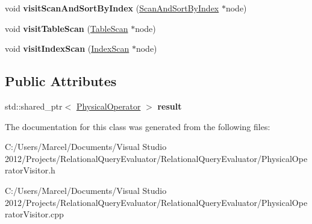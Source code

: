 \begin{DoxyCompactItemize}
\item 
\hypertarget{class_cloning_physical_operator_visitor_a5bead629c3b23b39316b8b86913617e7}{void {\bfseries visit\+Scan\+And\+Sort\+By\+Index} (\hyperlink{class_scan_and_sort_by_index}{Scan\+And\+Sort\+By\+Index} $\ast$node)}\label{class_cloning_physical_operator_visitor_a5bead629c3b23b39316b8b86913617e7}

\item 
\hypertarget{class_cloning_physical_operator_visitor_aa7066c58c8963023737f1b8e0eca7bca}{void {\bfseries visit\+Table\+Scan} (\hyperlink{class_table_scan}{Table\+Scan} $\ast$node)}\label{class_cloning_physical_operator_visitor_aa7066c58c8963023737f1b8e0eca7bca}

\item 
\hypertarget{class_cloning_physical_operator_visitor_ae5e119521bb2d4654eebba24bc469739}{void {\bfseries visit\+Index\+Scan} (\hyperlink{class_index_scan}{Index\+Scan} $\ast$node)}\label{class_cloning_physical_operator_visitor_ae5e119521bb2d4654eebba24bc469739}

\end{DoxyCompactItemize}
\subsection*{Public Attributes}
\begin{DoxyCompactItemize}
\item 
\hypertarget{class_cloning_physical_operator_visitor_aa3705b767976ef07fdfe39458543138e}{std\+::shared\+\_\+ptr$<$ \hyperlink{class_physical_operator}{Physical\+Operator} $>$ {\bfseries result}}\label{class_cloning_physical_operator_visitor_aa3705b767976ef07fdfe39458543138e}

\end{DoxyCompactItemize}


The documentation for this class was generated from the following files\+:\begin{DoxyCompactItemize}
\item 
C\+:/\+Users/\+Marcel/\+Documents/\+Visual Studio 2012/\+Projects/\+Relational\+Query\+Evaluator/\+Relational\+Query\+Evaluator/Physical\+Operator\+Visitor.\+h\item 
C\+:/\+Users/\+Marcel/\+Documents/\+Visual Studio 2012/\+Projects/\+Relational\+Query\+Evaluator/\+Relational\+Query\+Evaluator/Physical\+Operator\+Visitor.\+cpp\end{DoxyCompactItemize}
